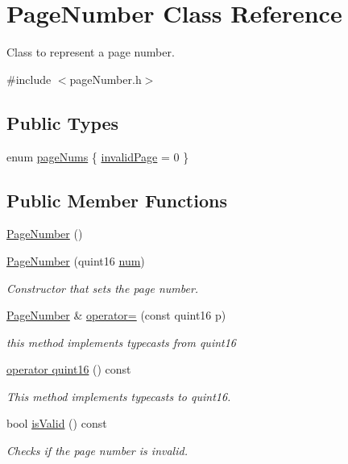 \hypertarget{classPageNumber}{\section{Page\+Number Class Reference}
\label{classPageNumber}
}


Class to represent a page number.  




{\ttfamily \#include $<$page\+Number.\+h$>$}

\subsection*{Public Types}
\begin{DoxyCompactItemize}
\item 
enum \hyperlink{classPageNumber_a9521b37657ab0c88e07c67ab75f48b92}{page\+Nums} \{ \hyperlink{classPageNumber_a9521b37657ab0c88e07c67ab75f48b92af17674d62e6864de4cd9fd233bbd6b1d}{invalid\+Page} = 0
 \}
\end{DoxyCompactItemize}
\subsection*{Public Member Functions}
\begin{DoxyCompactItemize}
\item 
\hyperlink{classPageNumber_ae53d122d8f420761e0f6530a1a7d3d70}{Page\+Number} ()
\item 
\hyperlink{classPageNumber_a2b829eb70b97762152cf9ad195c81e2d}{Page\+Number} (quint16 \hyperlink{xdvi_8h_ac675915823064aa6f5ca36bdfddd0a5b}{num})
\begin{DoxyCompactList}\small\item\em Constructor that sets the page number. \end{DoxyCompactList}\item 
\hyperlink{classPageNumber}{Page\+Number} \& \hyperlink{classPageNumber_a4e6935a898b90e607dd147ca6eee19d9}{operator=} (const quint16 p)
\begin{DoxyCompactList}\small\item\em this method implements typecasts from quint16 \end{DoxyCompactList}\item 
\hyperlink{classPageNumber_a6d34ca3cade984c20ac89b0200d6eb6f}{operator quint16} () const 
\begin{DoxyCompactList}\small\item\em This method implements typecasts to quint16. \end{DoxyCompactList}\item 
bool \hyperlink{classPageNumber_a701f1be28f2dd97b88d83c4abce18645}{is\+Valid} () const 
\begin{DoxyCompactList}\small\item\em Checks if the page number is invalid. \end{DoxyCompactList}\end{DoxyCompactItemize}


